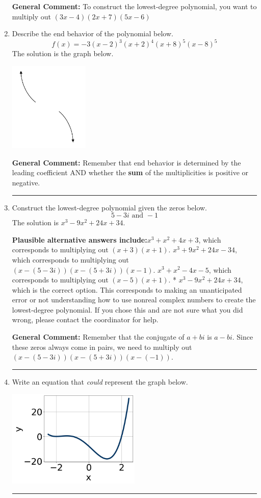 \documentclass{extbook}[14pt]
\newcommand{\litem}[1]{\item #1

\rule{\textwidth}{0.4pt}}
\begin{document}
\begin{enumerate}
{\textbf{General Comment:} To construct the lowest-degree polynomial, you want to multiply out $(3x -4)(2x + 7)(5x -6)$
}
\litem{
Describe the end behavior of the polynomial below.
\[ f(x) = -3(x - 2)^{3}(x + 2)^{4}(x + 8)^{5}(x - 8)^{5} \]The solution is the graph below.
    \begin{center}
        \includegraphics[width=0.3\textwidth]{../Figures/polyEndBehaviorCopyAA.png}
    \end{center}

\textbf{General Comment:} Remember that end behavior is determined by the leading coefficient AND whether the \textbf{sum} of the multiplicities is positive or negative.
}
\litem{
Construct the lowest-degree polynomial given the zeros below.
\[ 5 - 3 i \text{ and } -1 \]The solution is \( x^{3} -9 x^{2} +24 x + 34 \).\begin{enumerate}[label=\Alph*.]
\textbf{Plausible alternative answers include:}$x^{3} + x^{2} +4 x + 3$, which corresponds to multiplying out $(x + 3)(x + 1)$.
$x^{3} +9 x^{2} +24 x -34$, which corresponds to multiplying out $(x-(5 - 3 i))(x-(5 + 3 i))(x -1)$.
$x^{3} + x^{2} -4 x -5$, which corresponds to multiplying out $(x -5)(x + 1)$.
* $x^{3} -9 x^{2} +24 x + 34$, which is the correct option.
This corresponds to making an unanticipated error or not understanding how to use nonreal complex numbers to create the lowest-degree polynomial. If you chose this and are not sure what you did wrong, please contact the coordinator for help.
\end{enumerate}

\textbf{General Comment:} Remember that the conjugate of $a+bi$ is $a-bi$. Since these zeros always come in pairs, we need to multiply out $(x-(5 - 3 i))(x-(5 + 3 i))(x-(-1))$.
}
\litem{
Write an equation that \textit{could} represent the graph below.

\begin{center}
    \includegraphics[width=0.5\textwidth]{../Figures/polyGraphToFunctionCopyA.png}
\end{center}


}
\end{enumerate}
\end{document}
